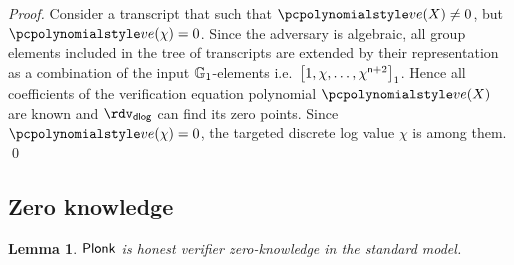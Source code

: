 \let\accentvec\vec \documentclass[runningheads,10pt]{llncs}
\newtheorem{lemma}[theorem]{Lemma}
\begin{document}
\begin{proof}
	 Consider a transcript that such that
	$\vereq(X) \neq 0$, but $\vereq(\chi) = 0$.
	Since the adversary is algebraic, all group elements included in the tree of
  transcripts are extended by their representation as a combination of the input
  $\mathbb{G}_1$-elements i.e.~$\left[1, \chi, \ldots, \chi^{\mathsf{n} +
      2}\right]_{1}$. Hence all coefficients of the verification equation polynomial
  $\vereq(X)$ are known and $\rdvdlog$ can find its zero points. Since
  $\vereq(\chi) = 0$, the targeted discrete log value $\chi$ is among them.
	\qed
\end{proof}

\subsection{Zero knowledge}
\begin{lemma}
	$\textnormal{\textsf{Plonk}}$ is honest verifier zero-knowledge in the standard model.	
\end{lemma}
\end{document}
